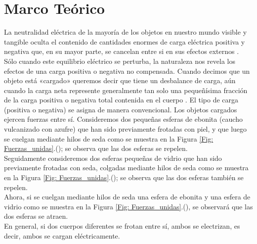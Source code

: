 \documentclass[10pt,journal]{IEEEtran}
\begin{document}
\section{Marco Teórico}
La neutralidad eléctrica de la mayoría de los objetos en nuestro mundo visible y tangible oculta el contenido de cantidades enormes de carga eléctrica positiva y negativa que, en su mayor parte, se cancelan entre si en sus efectos externos \cite{resnick2002fisica}. Sólo cuando este equilibrio eléctrico se perturba, la naturaleza nos revela los efectos de una carga positiva o negativa no compensada. Cuando decimos que un objeto está «cargado» queremos decir que tiene un desbalance de carga, aún cuando la carga neta represente generalmente tan solo una pequeñísima fracción de la carga positiva o negativa total contenida en el cuerpo \cite{barco2012fisica}. El tipo de carga (positiva o negativa) se asigna de manera convencional. Los objetos cargados ejercen fuerzas entre sí. Consideremos dos pequeñas esferas de ebonita (caucho vulcanizado con azufre) que han sido previamente frotadas con piel, y que luego se cuelgan mediante hilos de seda como se muestra en la Figura \ref{Fig: Fuerzas_unidas}.(); se observa que las dos esferas se repelen.\\
Seguidamente consideremos dos esferas pequeñas de vidrio que han
sido previamente frotadas con seda, colgadas mediante hilos de seda como se muestra en la Figura \ref{Fig: Fuerzas_unidas}.(); se observa que las dos esferas también se repelen.\\
Ahora, si se cuelgan mediante hilos de seda una esfera de ebonita y una esfera de vidrio como se muestra en la Figura \ref{Fig: Fuerzas_unidas}.(), se observará que las dos esferas se atraen.\\
En general, si dos cuerpos diferentes se frotan entre sí, ambos se electrizan, es decir, ambos se cargan eléctricamente.\\ 
\end{document}

